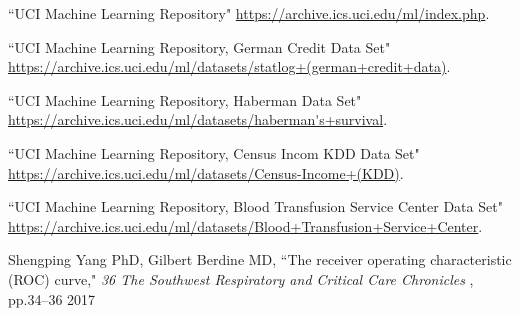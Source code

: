 \begin{thebibliography}{99}%

``UCI Machine Learning Repository" \url{https://archive.ics.uci.edu/ml/index.php}.

``UCI Machine Learning Repository, German Credit Data Set" \url{https://archive.ics.uci.edu/ml/datasets/statlog+(german+credit+data)}.

``UCI Machine Learning Repository, Haberman Data Set" \url{https://archive.ics.uci.edu/ml/datasets/haberman's+survival}.

``UCI Machine Learning Repository, Census Incom KDD Data Set" \url{https://archive.ics.uci.edu/ml/datasets/Census-Income+(KDD)}.

``UCI Machine Learning Repository, Blood Transfusion Service Center Data Set" \url{https://archive.ics.uci.edu/ml/datasets/Blood+Transfusion+Service+Center}.

Shengping Yang PhD,
Gilbert Berdine MD,
``The receiver operating characteristic (ROC) curve," {\it 36 The Southwest Respiratory and Critical Care Chronicles }, pp.34–36 2017

\end{thebibliography}
